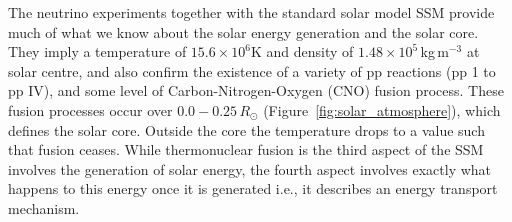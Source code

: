 The neutrino experiments together with the standard solar model SSM provide much of what we know about the solar energy generation and the solar core. They imply a temperature of $15.6\times10^6$K and density of $1.48\times10^5$\,kg\,m$^{-3}$ at solar centre, and also confirm the existence of a variety of pp reactions (pp 1 to pp IV), and some level of Carbon-Nitrogen-Oxygen (CNO) fusion process. These fusion processes occur over $0.0-0.25\,R_{\odot}$ (Figure~\ref{fig:solar_atmosphere}), which defines the solar core. Outside the core the temperature drops to a value such that fusion ceases. While thermonuclear fusion is the third aspect of the SSM involves the generation of solar energy, the fourth aspect involves exactly what happens to this energy once it is generated i.e., it describes an energy transport mechanism.


